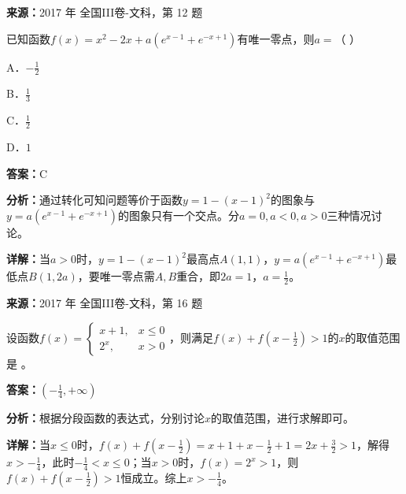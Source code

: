 \begin{question}[points=5]
\textbf{来源：}2017 年 全国III卷-文科，第 12 题\par
已知函数$f(x)=x^2-2x+a(e^{x-1}+e^{-x+1})$有唯一零点，则$a=$（          ）
\begin{choices}
  \item A．$-\frac{1}{2}$
  \item B．$\frac{1}{3}$
  \item C．$\frac{1}{2}$
  \item D．$1$
\end{choices}
\begin{solution}
\textbf{答案：}C

\textbf{分析：}通过转化可知问题等价于函数$y=1-(x-1)^2$的图象与$y=a(e^{x-1}+e^{-x+1})$的图象只有一个交点。分$a=0,a<0,a>0$三种情况讨论。

\textbf{详解：}当$a>0$时，$y=1-(x-1)^2$最高点$A(1,1)$，$y=a(e^{x-1}+e^{-x+1})$最低点$B(1,2a)$，要唯一零点需$A,B$重合，即$2a=1$，$a=\frac{1}{2}$。
\end{solution}
\end{question}

\begin{question}[points=5]
\textbf{来源：}2017 年 全国III卷-文科，第 16 题\par
设函数$f(x)=\begin{cases} x+1,&x\le 0 \\ 2^x,&x>0 \end{cases}$，则满足$f(x)+f(x-\frac{1}{2})>1$的$x$的取值范围是           。
\begin{solution}
\textbf{答案：}$(-\frac{1}{4},+\infty)$

\textbf{分析：}根据分段函数的表达式，分别讨论$x$的取值范围，进行求解即可。

\textbf{详解：}当$x\le 0$时，$f(x)+f(x-\frac{1}{2})=x+1+x-\frac{1}{2}+1=2x+\frac{3}{2}>1$，解得$x>-\frac{1}{4}$，此时$-\frac{1}{4}<x\le 0$；当$x>0$时，$f(x)=2^x>1$，则$f(x)+f(x-\frac{1}{2})>1$恒成立。综上$x>-\frac{1}{4}$。
\end{solution}
\end{question}

